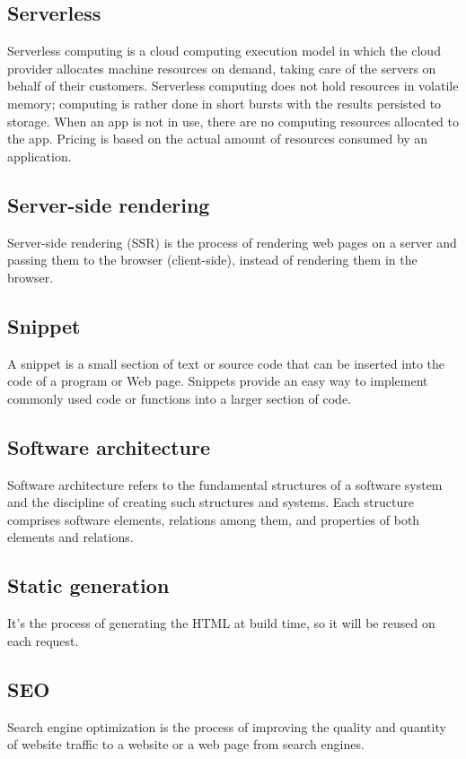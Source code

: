 \subsection*{Serverless}
Serverless computing is a cloud computing execution model in which the cloud provider allocates machine resources on demand,
taking care of the servers on behalf of their customers. Serverless computing does not hold resources in volatile memory;
computing is rather done in short bursts with the results persisted to storage. When an app is not in use,
there are no computing resources allocated to the app. Pricing is based on the actual amount of resources consumed
by an application.
\subsection*{Server-side rendering}
Server-side rendering (SSR) is the process of rendering web pages on a server and passing them to the browser (client-side), instead of rendering them in the browser.
\subsection*{Snippet}
A snippet is a small section of text or source code that can be inserted into the code of a program or Web page. Snippets provide an easy way to implement commonly used code or functions into a larger section of code.
\subsection*{Software architecture}
Software architecture refers to the fundamental structures of a software system and the discipline of creating such structures and systems. Each structure comprises software elements, relations among them, and properties of both elements and relations.
\subsection*{Static generation}
It's the process of generating the HTML at build time, so it will be reused on each request.
\subsection*{SEO} Search engine optimization is the process of improving the quality and quantity of website traffic to a website or a web page from search engines.

